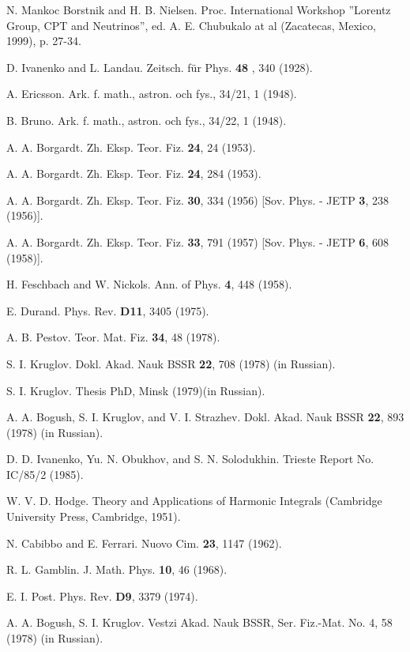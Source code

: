\documentclass[a4paper,12pt]{article}
\begin{document}
\begin{thebibliography}{99}
\bibitem{}  N. Mankoc Borstnik and H. B. Nielsen. Proc. International
Workshop ''Lorentz Group, CPT and Neutrinos'', ed. A. E. Chubukalo
at al (Zacatecas, Mexico, 1999), p. 27-34.

\bibitem{}  D. Ivanenko and L. Landau. Zeitsch. f\"ur Phys. \textbf{48
}, 340 (1928).

\bibitem{}  A. Ericsson. Ark. f. math., astron. och fys., 34/21, 1 (1948).

\bibitem{}  B. Bruno. Ark. f. math., astron. och fys., 34/22, 1 (1948).

\bibitem{}  A. A. Borgardt. Zh. Eksp. Teor. Fiz. \textbf{24}, 24 (1953).

\bibitem{}  A. A. Borgardt. Zh. Eksp. Teor. Fiz. \textbf{24}, 284 (1953).

\bibitem{}  A. A. Borgardt. Zh. Eksp. Teor. Fiz. \textbf{30}, 334 (1956)
[Sov. Phys. - JETP \textbf{3}, 238 (1956)].

\bibitem{}  A. A. Borgardt. Zh. Eksp. Teor. Fiz. \textbf{33}, 791 (1957)
[Sov. Phys. - JETP \textbf{6}, 608 (1958)].

\bibitem{}  H. Feschbach and W. Nickols. Ann. of Phys. \textbf{4},
448 (1958).

\bibitem{}  E. Durand. Phys. Rev. \textbf{D11}, 3405 (1975).

\bibitem{}  A. B. Pestov. Teor. Mat. Fiz. \textbf{34}, 48 (1978).

\bibitem{}  S. I. Kruglov. Dokl. Akad. Nauk BSSR \textbf{22}, 708 (1978) (in
Russian).

\bibitem{}  S. I. Kruglov. Thesis PhD, Minsk (1979)(in Russian).

\bibitem{}  A. A. Bogush, S. I. Kruglov, and V. I. Strazhev. Dokl.
Akad. Nauk BSSR \textbf{22}, 893 (1978) (in Russian).

\bibitem{}  D. D. Ivanenko, Yu. N. Obukhov, and S. N. Solodukhin.
Trieste Report No. IC/85/2 (1985).

\bibitem{}  W. V. D. Hodge. Theory and Applications of Harmonic
Integrals (Cambridge University Press, Cambridge, 1951).

\bibitem{}  N. Cabibbo and E. Ferrari. Nuovo Cim. \textbf{23}, 1147 (1962).

\bibitem{}  R. L. Gamblin. J. Math. Phys. \textbf{10}, 46 (1968).

\bibitem{}  E. I. Post. Phys. Rev. \textbf{D9}, 3379 (1974).

\bibitem{}  A. A. Bogush, S. I. Kruglov. Vestzi Akad. Nauk BSSR, Ser.
Fiz.-Mat. No. 4, 58 (1978) (in Russian).


\end{thebibliography}
\end{document}
